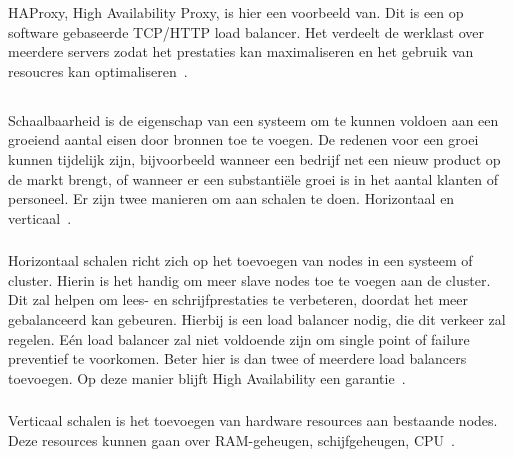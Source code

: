 HAProxy, High Availability Proxy, is hier een voorbeeld van. Dit is een op software gebaseerde TCP/HTTP load balancer. Het verdeelt de werklast over meerdere servers zodat het prestaties kan maximaliseren en het gebruik van resoucres kan optimaliseren~\autocite{SeveralNines2020}.

\subsection{}
\label{subsec:Schaalbaarheid}

Schaalbaarheid is de eigenschap van een systeem om te kunnen voldoen aan een groeiend aantal eisen door bronnen toe te voegen. De redenen voor een groei kunnen tijdelijk zijn, bijvoorbeeld wanneer een bedrijf net een nieuw product op de markt brengt, of wanneer er een substantiële groei is in het aantal klanten of personeel. Er zijn twee manieren om aan schalen te doen. Horizontaal en verticaal~\autocite{Insausti2019}.

\subsubsection{}
\label{subsubsec:Horizontaal schalen}
Horizontaal schalen richt zich op het toevoegen van nodes in een systeem of cluster. Hierin is het handig om meer slave nodes toe te voegen aan de cluster. Dit zal helpen om lees- en schrijfprestaties te verbeteren, doordat het meer gebalanceerd kan gebeuren. Hierbij is een load balancer nodig, die dit verkeer zal regelen. Eén load balancer zal niet voldoende zijn om single point of failure preventief te voorkomen. Beter hier is dan twee of meerdere load balancers toevoegen. Op deze manier blijft High Availability een garantie~\autocite{Insausti2019}.

\subsubsection{}
\label{subsubsec:Verticaal schalen}
Verticaal schalen is het toevoegen van hardware resources aan bestaande nodes. Deze resources kunnen gaan over RAM-geheugen, schijfgeheugen, CPU~\autocite{Insausti2019}.

\section{}
\label{sec:Cluster solutions}

